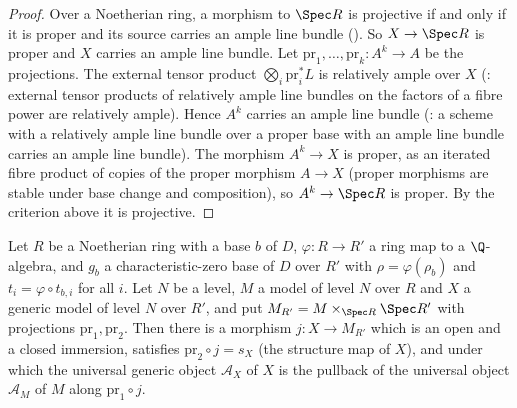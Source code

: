 \begin{proof}
Over a Noetherian ring, a morphism to $\Spec R$ is projective if and only if it is proper and its
source carries an ample line bundle
(). So $X\to\Spec R$ is proper
and $X$ carries an ample line bundle. Let $\mathrm{pr}_1,\dots,\mathrm{pr}_k\colon A^k\to A$ be the
projections. The external tensor product $\bigotimes_i\mathrm{pr}_i^*L$ is relatively ample over $X$
(: external tensor products of relatively ample line bundles on
the factors of a fibre power are relatively ample). Hence $A^k$ carries an ample line bundle
(: a scheme with a relatively ample
line bundle over a proper base with an ample line bundle carries an ample line bundle). The morphism
$A^k\to X$ is proper, as an iterated fibre product of copies of the proper morphism $A\to X$ (proper
morphisms are stable under base change and composition), so $A^k\to\Spec R$ is proper. By the
criterion above it is projective.
\end{proof}

\begin{proposition}\label{pf:ks2:genmodel}
Let $R$ be a Noetherian ring with a base $b$ of $D$, $\varphi\colon R\to R'$ a ring map to a
$\Q$-algebra, and $g_b$ a characteristic-zero base of $D$ over $R'$ with $\rho=\varphi(\rho_b)$ and
$t_i=\varphi\circ t_{b,i}$ for all $i$. Let $N$ be a level, $M$ a model of level $N$ over $R$ and $X$
a generic model of level $N$ over $R'$, and put $M_{R'}=M\times_{\Spec R}\Spec R'$ with projections
$\mathrm{pr}_1,\mathrm{pr}_2$. Then there is a morphism $j\colon X\to M_{R'}$ which is an open and a
closed immersion, satisfies $\mathrm{pr}_2\circ j=s_X$ (the structure map of $X$), and under which
the universal generic object $\mathcal A_X$ of $X$ is the pullback of the universal object
$\mathcal A_M$ of $M$ along $\mathrm{pr}_1\circ j$.
\end{proposition}

